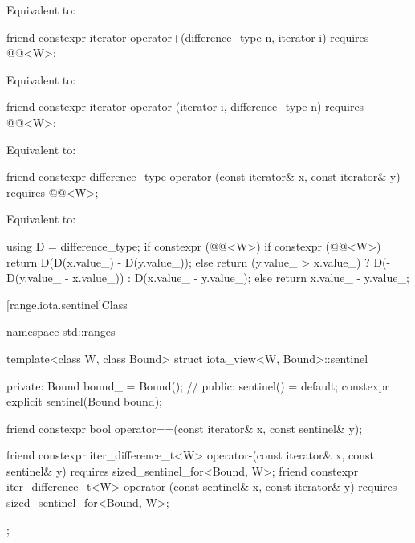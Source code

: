 \begin{itemdescr}
\pnum
\effects Equivalent to: 
\end{itemdescr}

\begin{itemdecl}
friend constexpr iterator operator+(difference_type n, iterator i)
  requires @@<W>;
\end{itemdecl}

\begin{itemdescr}
\pnum
\effects Equivalent to: 
\end{itemdescr}

\begin{itemdecl}
friend constexpr iterator operator-(iterator i, difference_type n)
  requires @@<W>;
\end{itemdecl}

\begin{itemdescr}
\pnum
\effects Equivalent to: 
\end{itemdescr}

\begin{itemdecl}
friend constexpr difference_type operator-(const iterator& x, const iterator& y)
  requires @@<W>;
\end{itemdecl}

\begin{itemdescr}
\pnum
\effects Equivalent to:
\begin{codeblock}
using D = difference_type;
if constexpr (@@<W>) {
  if constexpr (@@<W>)
    return D(D(x.value_) - D(y.value_));
  else
    return (y.value_ > x.value_)
      ? D(-D(y.value_ - x.value_))
      : D(x.value_ - y.value_);
} else {
  return x.value_ - y.value_;
}
\end{codeblock}
\end{itemdescr}

[range.iota.sentinel]{Class }

\begin{codeblock}
namespace std::ranges {
  template<class W, class Bound>
  struct iota_view<W, Bound>::sentinel {
  private:
    Bound bound_ = Bound();     // \expos
  public:
    sentinel() = default;
    constexpr explicit sentinel(Bound bound);

    friend constexpr bool operator==(const iterator& x, const sentinel& y);

    friend constexpr iter_difference_t<W> operator-(const iterator& x, const sentinel& y)
      requires sized_sentinel_for<Bound, W>;
    friend constexpr iter_difference_t<W> operator-(const sentinel& x, const iterator& y)
      requires sized_sentinel_for<Bound, W>;
  };
}
\end{codeblock}

